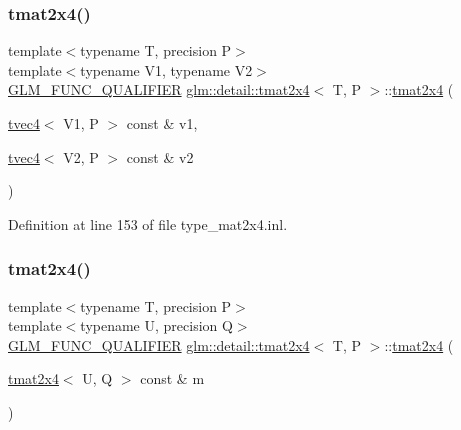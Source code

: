 \subsubsection{\texorpdfstring{tmat2x4()}{tmat2x4()}\hspace{0.1cm}{\footnotesize\ttfamily [21/22]}}
{\footnotesize\ttfamily template$<$typename T, precision P$>$ \\
template$<$typename V1, typename V2$>$ \\
\hyperlink{setup_8hpp_a33fdea6f91c5f834105f7415e2a64407}{G\+L\+M\+\_\+\+F\+U\+N\+C\+\_\+\+Q\+U\+A\+L\+I\+F\+I\+ER} \hyperlink{structglm_1_1detail_1_1tmat2x4}{glm\+::detail\+::tmat2x4}$<$ T, P $>$\+::\hyperlink{structglm_1_1detail_1_1tmat2x4}{tmat2x4} (\begin{DoxyParamCaption}\item[{\hyperlink{structglm_1_1detail_1_1tvec4}{tvec4}$<$ V1, P $>$ const \&}]{v1,  }\item[{\hyperlink{structglm_1_1detail_1_1tvec4}{tvec4}$<$ V2, P $>$ const \&}]{v2 }\end{DoxyParamCaption})}



Definition at line 153 of file type\+\_\+mat2x4.\+inl.

\mbox{\label{structglm_1_1detail_1_1tmat2x4_afdac996e0de8c8beee66facceed41f53}} 
\subsubsection{\texorpdfstring{tmat2x4()}{tmat2x4()}\hspace{0.1cm}{\footnotesize\ttfamily [22/22]}}
{\footnotesize\ttfamily template$<$typename T, precision P$>$ \\
template$<$typename U, precision Q$>$ \\
\hyperlink{setup_8hpp_a33fdea6f91c5f834105f7415e2a64407}{G\+L\+M\+\_\+\+F\+U\+N\+C\+\_\+\+Q\+U\+A\+L\+I\+F\+I\+ER} \hyperlink{structglm_1_1detail_1_1tmat2x4}{glm\+::detail\+::tmat2x4}$<$ T, P $>$\+::\hyperlink{structglm_1_1detail_1_1tmat2x4}{tmat2x4} (\begin{DoxyParamCaption}\item[{\hyperlink{structglm_1_1detail_1_1tmat2x4}{tmat2x4}$<$ U, Q $>$ const \&}]{m }\end{DoxyParamCaption})}



